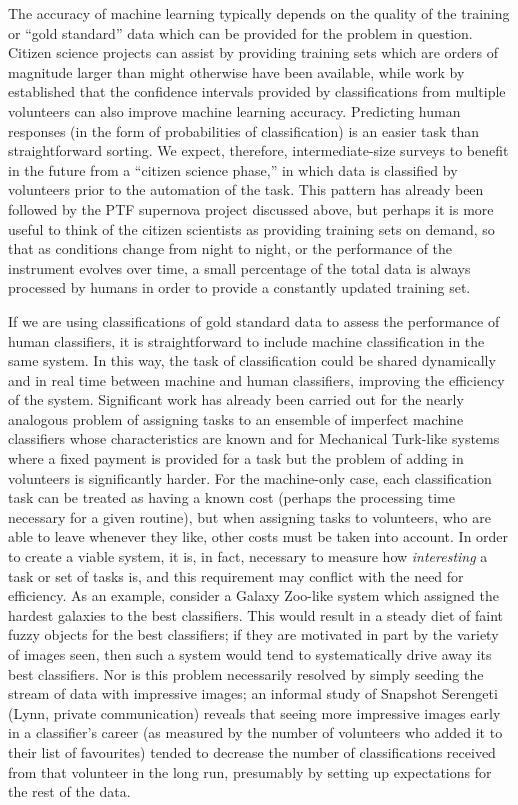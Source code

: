 \documentclass{ar2e}
\begin{document}
The accuracy of machine learning typically depends on the quality of the
training or ``gold standard'' data which can be provided for the problem in
question. Citizen science projects can assist by providing training sets which
are orders of magnitude larger than might otherwise have been available, while
work by \citet{Banerji++2010} established that the confidence intervals provided
by classifications from multiple volunteers can also improve machine learning
accuracy.  Predicting human responses (in the form of probabilities of
classification) is an easier task than straightforward sorting. We expect,
therefore, intermediate-size surveys to benefit in the future from a ``citizen
science phase,'' in which data is classified by volunteers prior to the
automation of the task. This pattern has already been followed by the PTF
supernova project discussed above, but perhaps it is more useful to think of the
citizen scientists as providing training sets on demand, so that as conditions
change from night to night, or the performance of the instrument evolves over
time, a small percentage of the total data is always processed by humans in
order to provide a constantly updated training set. 

If we are using classifications of gold standard data to assess the performance
of human classifiers, it is straightforward to include machine classification in
the same system. In this way, the task of classification could be shared
dynamically and in real time between machine and human classifiers, improving
the efficiency of the system. Significant work has already been carried out for
the nearly analogous problem of assigning tasks to an ensemble of imperfect
machine classifiers whose characteristics are known 
and for
Mechanical Turk-like systems where a fixed payment is provided for a task but
the problem of adding in volunteers is significantly harder.
For the machine-only case, each classification task can be treated as having a
known cost (perhaps the processing time necessary for a given routine), but when
assigning tasks to  volunteers, who are able to leave whenever they like, other
costs must be taken into account. In order to create a viable system, it is, in
fact, necessary to measure how {\it interesting} 
a task or set of tasks is, and this
requirement may conflict with the need for efficiency. As an example, consider a
Galaxy Zoo-like system which assigned the hardest galaxies to the best
classifiers. This would result in a steady diet of faint fuzzy objects for the
best classifiers; if they are motivated in part by the variety of images seen,
then such a system would tend to systematically drive away its best classifiers.
Nor is this problem necessarily resolved by simply seeding the stream of data with
impressive images; an informal study of Snapshot Serengeti (Lynn, private communication)
reveals that seeing more impressive images
early in a classifier's career (as measured by the number of volunteers who
added it to their list of favourites) tended to decrease the number of
classifications received from that volunteer in the long run, presumably by setting up
expectations for the rest of the data.
\end{document}
